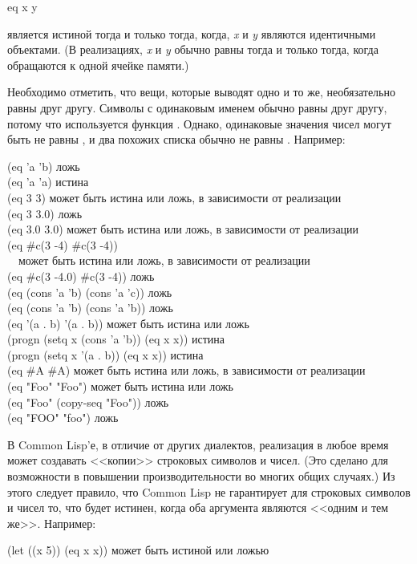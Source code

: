 \begin{defun}[Функция]
eq x y

 является истиной тогда и только тогда, когда,
\emph{x} и \emph{y} являются идентичными объектами.
(В реализациях, \emph{x} и \emph{y} обычно равны  тогда и только
тогда, когда обращаются к одной ячейке памяти.)

Необходимо отметить, что вещи, которые выводят одно и то же, необязательно равны
 друг другу. Символы с одинаковым именем обычно равны  друг
другу, потому что используется функция .
Однако, одинаковые значения чисел могут быть не равны , и два похожих
списка обычно не равны .
Например:
\begin{lisp}
(eq 'a 'b) \textrm{ложь} \\
(eq 'a 'a) \textrm{истина} \\
(eq 3 3) \textrm{может быть истина или ложь, в зависимости от реализации} \\
(eq 3 3.0) \textrm{ложь} \\
(eq 3.0 3.0) \textrm{может быть истина или ложь, в зависимости от реализации} \\
(eq \#c(3 -4) \#c(3 -4)) \\
~~\textrm{может быть истина или ложь, в зависимости от реализации} \\
(eq \#c(3 -4.0) \#c(3 -4)) \textrm{ложь} \\
(eq (cons 'a 'b) (cons 'a 'c)) \textrm{ложь} \\
(eq (cons 'a 'b) (cons 'a 'b)) \textrm{ложь} \\
(eq '(a . b) '(a . b)) \textrm{может быть истина или ложь} \\
(progn (setq x (cons 'a 'b)) (eq x x)) \textrm{истина} \\
(progn (setq x '(a . b)) (eq x x)) \textrm{истина} \\
(eq \#{\Xbackslash}A \#{\Xbackslash}A) \textrm{может быть истина или ложь, в зависимости от реализации} \\
(eq "Foo" "Foo") \textrm{может быть истина или ложь} \\
(eq "Foo" (copy-seq "Foo")) \textrm{ложь} \\
(eq "FOO" "foo") \textrm{ложь}
\end{lisp}

В Common Lisp'е, в отличие от других диалектов, реализация в любое время может
создавать <<копии>> строковых символов и чисел. (Это сделано для возможности в
повышении производительности во многих общих случаях.) Из этого следует правило,
что Common Lisp не гарантирует для строковых символов и чисел то, что 
будет истинен, когда оба аргумента являются <<одним и тем же>>.
Например:
\begin{lisp}
(let ((x 5)) (eq x x)) \textrm{может быть истиной или ложью}
\end{lisp}


\end{defun}
